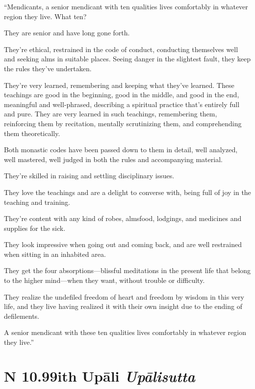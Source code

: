 \documentclass[12pt,openany]{book}%
\newcommand*{\suttatitleacronym}[1]{\smaller[2]{#1}\vspace*{.3em}}
\newcommand*{\suttatitletranslation}[1]{\linebreak{#1}}
\newcommand*{\suttatitleroot}[1]{\linebreak\smaller[2]\itshape{#1}}
\newcommand*{\tocacronym}[1]{\hspace*{-3.3em}{#1}\quad}
\newcommand*{\toctranslation}[1]{#1}
\newcommand*{\tocroot}[1]{(\textit{#1})}
\begin{document}
“Mendicants, a senior mendicant with ten qualities lives comfortably in whatever region they live. What ten? 

They are senior and have long gone forth. 

They’re ethical, restrained in the code of conduct, conducting themselves well and seeking alms in suitable places. Seeing danger in the slightest fault, they keep the rules they’ve undertaken. 

They’re very learned, remembering and keeping what they’ve learned. These teachings are good in the beginning, good in the middle, and good in the end, meaningful and well-phrased, describing a spiritual practice that’s entirely full and pure. They are very learned in such teachings, remembering them, reinforcing them by recitation, mentally scrutinizing them, and comprehending them theoretically. 

Both monastic codes have been passed down to them in detail, well analyzed, well mastered, well judged in both the rules and accompanying material. 

They’re skilled in raising and settling disciplinary issues. 

They love the teachings and are a delight to converse with, being full of joy in the teaching and training. 

They’re content with any kind of robes, almsfood, lodgings, and medicines and supplies for the sick. 

They look impressive when going out and coming back, and are well restrained when sitting in an inhabited area. 

They get the four absorptions—blissful meditations in the present life that belong to the higher mind—when they want, without trouble or difficulty. 

They realize the undefiled freedom of heart and freedom by wisdom in this very life, and they live having realized it with their own insight due to the ending of defilements. 

A senior mendicant with these ten qualities lives comfortably in whatever region they live.” 

%
\section*{{\suttatitleacronym AN 10.99}{\suttatitletranslation With Upāli }{\suttatitleroot Upālisutta}}
\addcontentsline{toc}{section}{\tocacronym{AN 10.99} \toctranslation{With Upāli } \tocroot{Upālisutta}}
\end{document}
